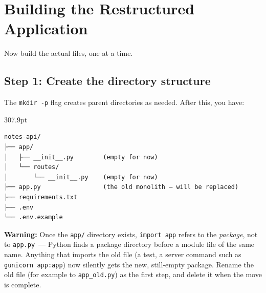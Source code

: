 \setcounter{section}{4}
\section{Building the Restructured Application}\label{15-structuring-the-application:155-building-the-restructured-application}

Now build the actual files, one at a time.

\subsection*{Step 1: Create the directory structure}\label{15-structuring-the-application:step-1-create-the-directory-structure}

\begin{codebox}[short]

\begin{Shaded}
\begin{Highlighting}[]
 
\end{Highlighting}
\end{Shaded}

\end{codebox}

\noindent{}The \texttt{mkdir\ -p} flag creates parent directories as needed. After this, you have:

\begin{diagrambox}[short]{307.9pt}
\begin{Verbatim}[fontsize=\fontsize{9.0}{8.55}\selectfont]
notes-api/
├── app/
│   ├── __init__.py        (empty for now)
│   └── routes/
│       └── __init__.py    (empty for now)
├── app.py                 (the old monolith — will be replaced)
├── requirements.txt
├── .env
└── .env.example
\end{Verbatim}
\end{diagrambox}

\begin{warnbox}

\textbf{Warning:} Once the \texttt{app/} directory exists, \texttt{import\ app} refers to the \emph{package}, not to \texttt{app.py}~--- Python finds a package directory before a module file of the same name. Anything that imports the old file (a test, a server command such as \texttt{gunicorn\ app:app}) now silently gets the new, still-empty package. Rename the old file (for example to \texttt{app\_old.py}) as the first step, and delete it when the move is complete.

\end{warnbox}

